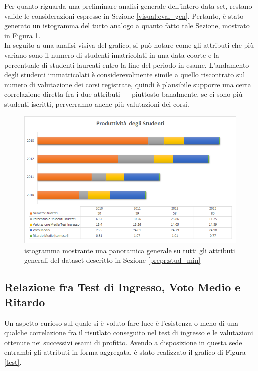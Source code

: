    Per quanto riguarda una preliminare analisi generale dell'intero data set, restano valide le considerazioni espresse in Sezione \ref{visual:eval_gen}. Pertanto, è stato generato un istogramma del tutto analogo a quanto fatto tale Sezione, mostrato in Figura \ref{stud_gen}. \\

    In seguito a una analisi visiva del grafico, si può notare come gli attributi che più variano sono il numero di studenti imatricolati in una data coorte e la percentuale di studenti laureati entro la fine del periodo in esame. L'andamento degli studenti immatricolati è considerevolmente simile a quello riscontrato sul numero di valutazione dei corsi registrate, quindi è plausibile supporre una certa correlazione diretta fra i due attributi --- piuttosto banalmente, se ci sono più studenti iscritti, perverranno anche più valutazioni dei corsi.

    \begin{figure}
        \centering
        \caption{istogramma mostrante una panoramica generale su tutti gli attributi generali del dataset descritto in Sezione \ref{prepr:stud_min}}
        \label{stud_gen}
        \includegraphics[scale=0.50]{../visual/stud_1.png}
    \end{figure}

    \subsection{Relazione fra Test di Ingresso, Voto Medio e Ritardo}

    Un aspetto curioso sul quale si è voluto fare luce è l'esistenza o meno di una qualche correlazione fra il risutlato conseguito nel test di ingresso e le valutazioni ottenute nei successivi esami di profitto. Avendo a disposizione in questa sede entrambi gli attributi in forma aggregata, è stato realizzato il grafico di Figura \ref{test}. \\

